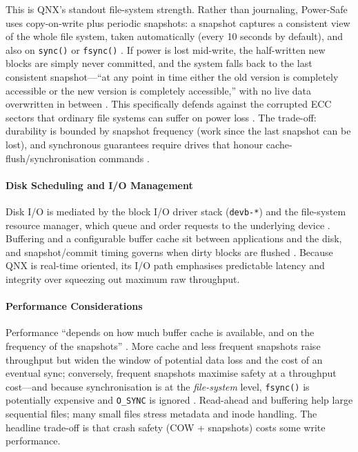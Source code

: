 This is QNX's standout file-system strength. Rather than journaling,
Power-Safe uses copy-on-write plus periodic snapshots: a snapshot
captures a consistent view of the whole file system, taken
automatically (every 10 seconds by default), and also on
\texttt{sync()} or \texttt{fsync()}
\citep{qnx_powersafe_fs, qnx_fs_fault_tolerance}. If power is lost
mid-write, the half-written new blocks are simply never committed, and
the system falls back to the last consistent snapshot---``at any point
in time either the old version is completely accessible or the new
version is completely accessible,'' with no live data overwritten in
between \citep{qnx_fs_fault_tolerance}. This specifically defends
against the corrupted ECC sectors that ordinary file systems can
suffer on power loss \citep{qnx_powersafe_fs}. The trade-off:
durability is bounded by snapshot frequency (work since the last
snapshot can be lost), and synchronous guarantees require drives that
honour cache-flush/synchronisation commands
\citep{qnx_fs_fault_tolerance}.

\paragraph{Disk Scheduling and I/O Management}

Disk I/O is mediated by the block I/O driver stack (\texttt{devb-*})
and the file-system resource manager, which queue and order requests
to the underlying device \citep{qnx_powersafe_fs}. Buffering and a
configurable buffer cache sit between applications and the disk, and
snapshot/commit timing governs when dirty blocks are flushed
\citep{qnx_powersafe_fs, qnx_powersafe_perf}. Because QNX is real-time
oriented, its I/O path emphasises predictable latency and integrity
over squeezing out maximum raw throughput.

\paragraph{Performance Considerations}

Performance ``depends on how much buffer cache is available, and on
the frequency of the snapshots'' \citep{qnx_powersafe_perf}. More cache
and less frequent snapshots raise throughput but widen the window of
potential data loss and the cost of an eventual sync; conversely,
frequent snapshots maximise safety at a throughput cost---and because
synchronisation is at the \emph{file-system} level, \texttt{fsync()} is
potentially expensive and \texttt{O\_SYNC} is ignored
\citep{qnx_powersafe_perf}. Read-ahead and buffering help large
sequential files; many small files stress metadata and inode handling.
The headline trade-off is that crash safety (COW + snapshots) costs
some write performance.

